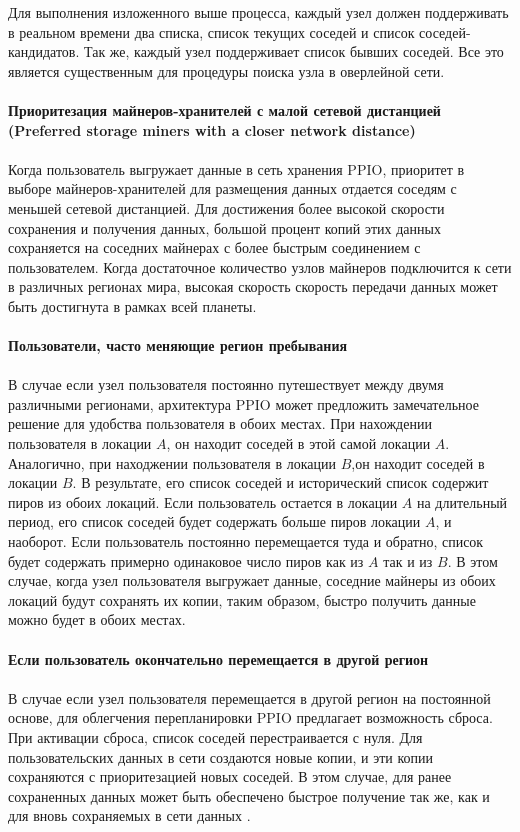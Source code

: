 \documentclass[10pt,a4paper]{article}
\begin{document}
\noindent  
Для выполнения изложенного выше процесса, каждый узел должен поддерживать в реальном времени два списка, список текущих соседей и список соседей-кандидатов. Так же, каждый узел поддерживает список бывших соседей. Все это является существенным для процедуры поиска узла в оверлейной сети.
\vspace{-0.5em}
\\ \\{\bf Приоритезация майнеров-хранителей с малой сетевой дистанцией (Preferred storage miners with a closer network distance)}
\vspace{-0.5em}
\\ \\Когда пользователь выгружает данные в сеть хранения PPIO, приоритет в выборе майнеров-хранителей для размещения данных отдается соседям с меньшей сетевой дистанцией. Для достижения более высокой скорости сохранения и получения данных, большой процент копий этих данных сохраняется на соседних майнерах с более быстрым соединением с пользователем. Когда достаточное количество узлов майнеров подключится к сети в различных регионах мира, высокая скорость скорость передачи данных может быть достигнута в рамках всей планеты.
\vspace{-0.5em}
\\ \\{\bf Пользователи, часто меняющие регион пребывания}
\vspace{-0.5em}
\\ \\В случае если узел пользователя постоянно путешествует между двумя различными регионами, архитектура PPIO может предложить замечательное решение для удобства пользователя в обоих местах. При нахождении пользователя в локации $A$, он находит соседей в этой самой локации $A$. Аналогично, при находжении пользователя в локации $B$,он находит соседей в локации $B$. В результате, его список соседей и исторический список содержит пиров из обоих локаций. Если пользователь остается в локации $A$ на длительный период, его список соседей будет содержать больше пиров локации $A$, и наоборот. Если пользователь постоянно перемещается туда и обратно, список будет содержать примерно одинаковое число пиров как из $A$ так и из $B$. В этом случае, когда узел пользователя выгружает данные, соседние майнеры из обоих локаций будут сохранять их копии, таким образом, быстро получить данные можно будет в обоих местах.
\vspace{-0.5em}
\\ \\{\bf Если пользователь окончательно перемещается в другой регион}
\vspace{-0.5em}
\\ \\В случае если узел пользователя перемещается в другой регион на постоянной основе, для облегчения перепланировки PPIO предлагает возможность сброса. При активации сброса, список соседей перестраивается с нуля. Для пользовательских данных в сети создаются новые копии, и эти копии сохраняются с приоритезацией новых соседей. В этом случае, для ранее сохраненных данных может быть обеспечено быстрое получение так же, как и для вновь сохраняемых в сети данных .
\vspace{-0.5em}
\end{document}

